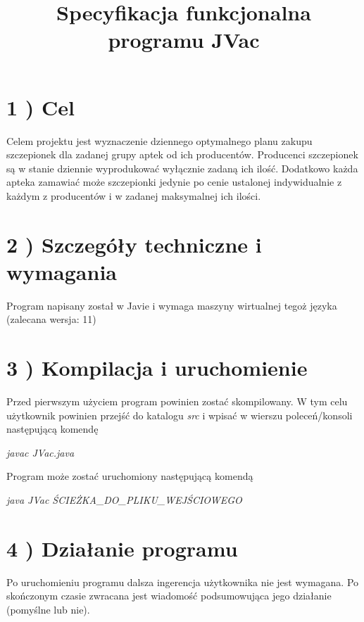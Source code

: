 \documentclass[]{article}
\title{Specyfikacja funkcjonalna programu JVac}
\date{}
\begin{document}
    \maketitle


    \section{1 ) Cel}

    Celem projektu jest wyznaczenie dziennego optymalnego planu zakupu
    szczepionek dla zadanej grupy aptek od ich producentów. Producenci
    szczepionek są w stanie dziennie wyprodukować wyłącznie zadaną ich
    ilość. Dodatkowo każda apteka zamawiać może szczepionki jedynie po cenie
    ustalonej indywidualnie z każdym z producentów i w zadanej maksymalnej
    ich ilości.


    \section{2 ) Szczegóły techniczne i wymagania}

    Program napisany został w Javie i wymaga maszyny wirtualnej tegoż języka
    (zalecana wersja: 11)


    \section{3 ) Kompilacja i uruchomienie}

    Przed pierwszym użyciem program powinien zostać skompilowany. W tym celu
    użytkownik powinien przejść do katalogu \emph{src} i wpisać w wierszu poleceń/konsoli następującą
    komendę

    \begin{center}
        \emph{javac JVac.java}
    \end{center}

    Program może zostać uruchomiony następującą komendą

    \begin{center}
        \emph{java JVac ŚCIEŻKA\_DO\_PLIKU\_WEJŚCIOWEGO}
    \end{center}


    \section{4 ) Działanie programu}

    Po uruchomieniu programu dalsza ingerencja użytkownika nie jest wymagana.
    Po skończonym czasie zwracana jest wiadomość podsumowująca jego działanie (pomyślne lub nie).
\end{document}

